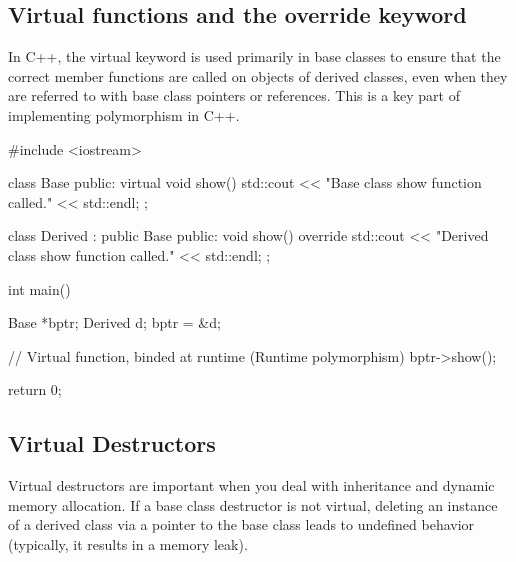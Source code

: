\documentclass{report}
\begin{document}
    \subsection{Virtual functions and the override keyword}
    \bigbreak \noindent 
    \begin{concept}
       In C++, the virtual keyword is used primarily in base classes to ensure that the correct member functions are called on objects of derived classes, even when they are referred to with base class pointers or references. This is a key part of implementing polymorphism in C++. 
    \end{concept}
    \bigbreak \noindent 
    \begin{cppcode}
#include <iostream>

class Base {
public:
    virtual void show() {
        std::cout << "Base class show function called." << std::endl;
    }
};

class Derived : public Base {
public:
    void show() override {
        std::cout << "Derived class show function called." << std::endl;
    }
};

int main() {
    Base *bptr;
    Derived d;
    bptr = &d;

    // Virtual function, binded at runtime (Runtime polymorphism)
    bptr->show();

    return 0;
}
    \end{cppcode}


    \bigbreak \noindent 
    \subsection{Virtual Destructors}
    \bigbreak \noindent 
    \begin{concept}
        Virtual destructors are important when you deal with inheritance and dynamic memory allocation. If a base class destructor is not virtual, deleting an instance of a derived class via a pointer to the base class leads to undefined behavior (typically, it results in a memory leak).
    \end{concept}
    

    \pagebreak \bigbreak \noindent 
\end{document}
